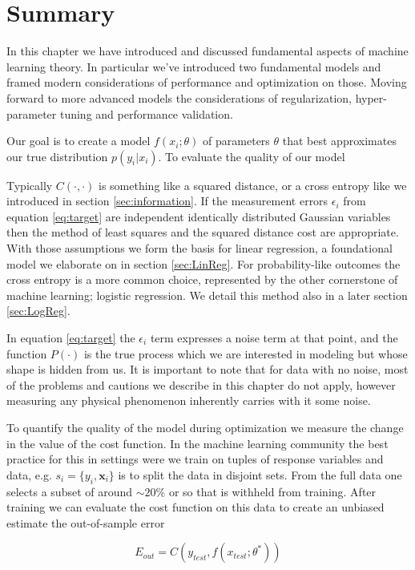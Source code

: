 \section{Summary}

In this chapter we have introduced and discussed fundamental aspects of machine learning theory. In particular we've introduced two fundamental models and framed modern considerations of performance and optimization on those. Moving forward to more advanced models the considerations of regularization, hyper-parameter tuning and performance validation.

Our goal is to create a model $f(x_i; \theta)$ of parameters $\theta$ that best approximates our true distribution $p(y_i | x_i)$. To evaluate the quality of our model 

Typically $C(\cdot, \cdot)$ is something like a squared distance, or a cross entropy like we introduced in section \ref{sec:information}. If the measurement errors $\epsilon_i$ from equation \ref{eq:target} are independent identically distributed Gaussian variables then the method of least squares and the squared distance cost are appropriate. With those assumptions we form the basis for linear regression, a foundational model we elaborate on in section \ref{sec:LinReg}. For probability-like outcomes the cross entropy is a more common choice, represented by the other cornerstone of machine learning; logistic regression. We detail this method also in a later section \ref{sec:LogReg}. 

In equation \ref{eq:target} the $\epsilon_i$ term expresses a noise term at that point, and the function $P(\cdot)$ is the true process which we are interested in modeling but whose shape is hidden from us. It is important to note that for data with no noise, most of the problems and cautions we describe in this chapter do not apply, however measuring any physical phenomenon inherently carries with it some noise.

To quantify the quality of the model during optimization we measure the change in the value of the cost function. In the machine learning community the best practice for this in settings were we train on tuples of response variables and data, e.g. $s_i = \{y_i, \mathbf{x}_i\}$ is to split the data in disjoint sets. From the full data one selects a subset of around $\sim 20\%$ or so that is withheld from training. After training we can evaluate the cost function on this data to create an unbiased estimate the out-of-sample error

\begin{equation}
E_{out} = C(y_{test}, f(x_{test}; \theta^*))
\end{equation}

